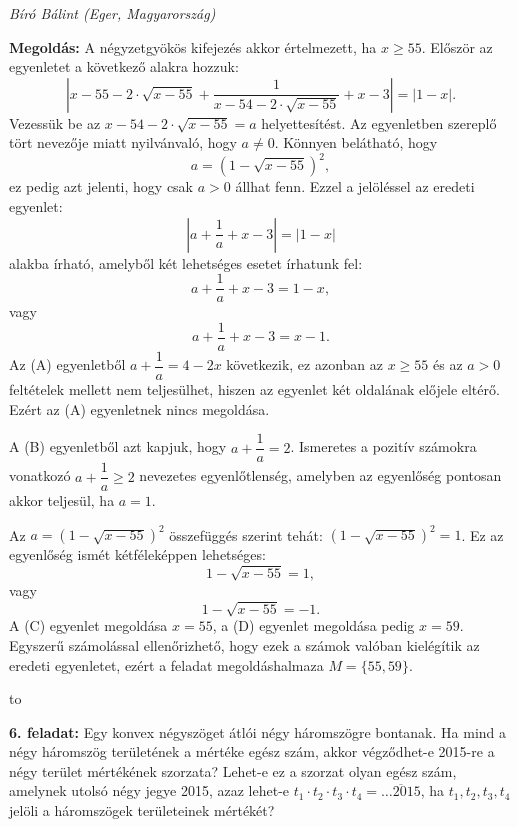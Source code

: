 \documentclass[a4paper,10pt,leqno]{article}
\newcommand{\ki}[2]{\hfill {\it #1 (#2)}\medskip}
\newcommand{\vonal}{\hbox to \hsize{\hskip2truecm\hrulefill\hskip2truecm}}
\begin{document}
\ki{Bíró Bálint}{Eger, Magyarország}\medskip

{\bf Megoldás: } A négyzetgyökös kifejezés akkor értelmezett, ha $x\ge 55$. Először az egyenletet a következő alakra hozzuk:
$$\left|x-55-2\cdot\sqrt{x-55}+\frac{1}{x-54-2\cdot\sqrt{x-55}}+x-3\right|=|1-x|.$$
Vezessük be az $x-54-2\cdot\sqrt{x-55}=a$ helyettesítést. Az egyenletben szereplő tört nevezője miatt nyilvánvaló, hogy $a\ne 0$. Könnyen belátható, hogy 
$$a=\left(1-\sqrt{x-55}\right)^2,$$
ez pedig azt jelenti, hogy csak $a>0$ állhat fenn.
Ezzel a jelöléssel az eredeti egyenlet:
$$\left|a+\frac{1}{a}+x-3\right|=|1-x|$$
alakba írható, amelyből két lehetséges esetet írhatunk fel:
\begin{equation}
a+\frac{1}{a}+x-3=1-x, \tag{A}
\end{equation}
vagy
\begin{equation}
a+\frac{1}{a}+x-3=x-1. \tag{B}
\end{equation}
Az (A) egyenletből $a+\dfrac{1}{a}=4-2x$ következik, ez azonban az $x\ge 55$ és az $a>0$ feltételek mellett nem teljesülhet, hiszen az egyenlet két oldalának előjele eltérő. Ezért az (A) egyenletnek nincs megoldása.

A (B) egyenletből azt kapjuk, hogy $a+\dfrac{1}{a}=2$. Ismeretes a pozitív számokra vonatkozó  $a+\dfrac{1}{a}\ge 2$ nevezetes egyenlőtlenség, amelyben az egyenlőség pontosan akkor teljesül, ha $a=1$.
 
Az $a=\left(1-\sqrt{x-55}\right)^2$ összefüggés szerint tehát: $\left(1-\sqrt{x-55}\right)^2=1$.
Ez az egyenlőség ismét kétféleképpen lehetséges:
\begin{equation}
1-\sqrt{x-55}=1, \tag{C}
\end{equation}
vagy
\begin{equation}
1-\sqrt{x-55}=-1. \tag{D}
\end{equation}
A (C) egyenlet megoldása $x=55$, a (D) egyenlet megoldása pedig $x=59$.
Egyszerű számolással ellenőrizhető, hogy ezek a számok valóban kielégítik az eredeti egyenletet, ezért a feladat megoldáshalmaza $M=\{55, 59\}$.

\vonal


{\bf 6. feladat: } Egy konvex négyszöget átlói négy háromszögre bontanak. Ha mind a négy háromszög területének a mértéke egész szám, akkor végződhet-e 2015-re a négy terület mértékének szorzata? Lehet-e ez a szorzat olyan egész szám, amelynek utolsó négy jegye 2015, azaz lehet-e 
$t_1\cdot t_2\cdot t_3 \cdot t_4 = \overline{\ldots2015}$, ha $t_1, t_2, t_3, t_4$ jelöli a háromszögek területeinek mértékét?
\end{document}
